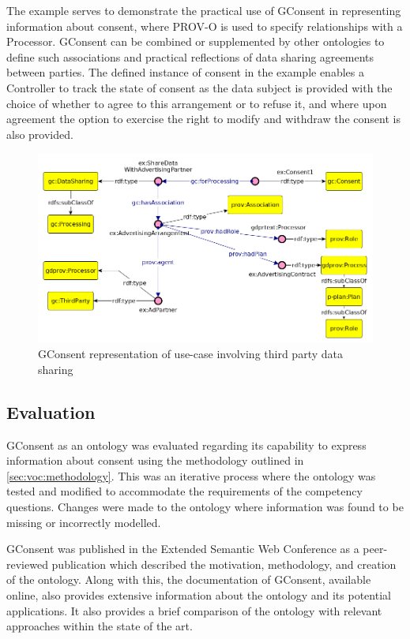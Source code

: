 The example serves to demonstrate the practical use of GConsent in representing information about consent, where PROV-O is used to specify relationships with a Processor. GConsent can be combined or supplemented by other ontologies to define such associations and practical reflections of data sharing agreements between parties. The defined instance of consent in the example enables a Controller to track the state of consent as the data subject is provided with the choice of whether to agree to this arrangement or to refuse it, and where upon agreement the option to exercise the right to modify and withdraw the consent is also provided.
\begin{figure}[htbp]
    \centering
    \includegraphics[width=0.8\linewidth]{img/gconsent_third_party_datasharing.png}
    \caption{GConsent representation of use-case involving third party data sharing \cite{pandit_gconsent_2019}}
    \label{fig:vocabs:gconsent-example}
\end{figure}

\subsection{Evaluation}
GConsent as an ontology was evaluated regarding its capability to express information about consent using the methodology outlined in \autoref{sec:voc:methodology}.
This was an iterative process where the ontology was tested and modified to accommodate the requirements of the competency questions. Changes were made to the ontology where information was found to be missing or incorrectly modelled.

GConsent was published in the Extended Semantic Web Conference as a peer-reviewed publication \cite{pandit_gconsent_2019} which described the motivation, methodology, and creation of the ontology. Along with this, the documentation of GConsent, available online, also provides extensive information about the ontology and its potential applications. It also provides a brief comparison of the ontology with relevant approaches within the state of the art.

